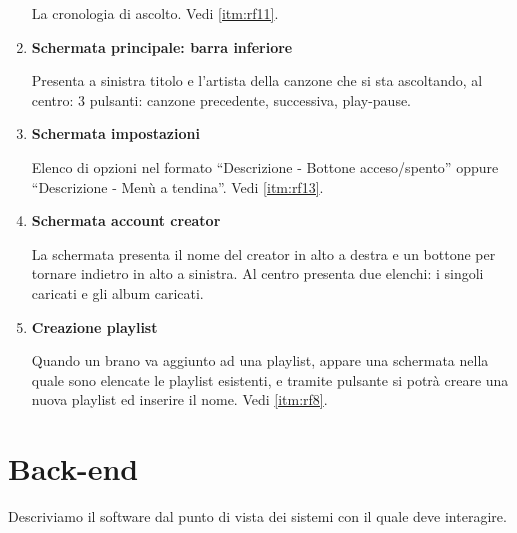 \documentclass[a4paper,12pt]{article}
\begin{document}
\begin{enumerate}[label=\textbf{FE\arabic*}\;, ref=\textbf{FE\arabic*}]
    La cronologia di ascolto. Vedi \ref{itm:rf11}.
    \item \label{itm:fe9} \textbf{Schermata principale: barra inferiore}
    
    Presenta a sinistra titolo e l’artista della canzone che si sta ascoltando, al centro: 3 pulsanti: canzone precedente, successiva, play-pause.
    \item \label{itm:fe10} \textbf{Schermata impostazioni}
    
    Elenco di opzioni nel formato “Descrizione - Bottone acceso/spento” oppure “Descrizione - Menù a tendina”. Vedi \ref{itm:rf13}.
    \item \label{itm:fe11} \textbf{Schermata account creator}
    
    La schermata presenta il nome del creator in alto a destra e un bottone per tornare indietro in alto a sinistra. Al centro presenta due elenchi: i singoli caricati e gli album caricati.
    \item \label{itm:fe12} \textbf{Creazione playlist}
    
    Quando un brano va aggiunto ad una playlist, appare una schermata nella quale sono elencate le playlist esistenti, e tramite pulsante si potrà creare una nuova playlist ed inserire il nome. Vedi \ref{itm:rf8}. 
\end{enumerate}

\section{Back-end}

Descriviamo il software dal punto di vista dei sistemi con il quale deve interagire.
\end{document}
